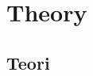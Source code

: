
\chapter{Theory} %


\ifpdf
    \graphicspath{{3/figures/PNG/}{3/figures/PDF/}{3/figures/}}
\else
    \graphicspath{{3/figures/EPS/}{3/figures/}}
\fi

\graphicspath{{3/figures/}{3/figures/}}


\section{Teori}




